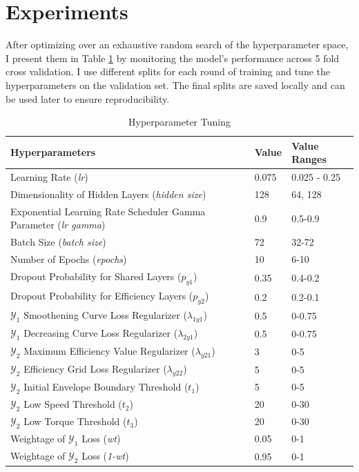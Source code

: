 \documentclass{report} %
\begin{document}
\section{Experiments}\label{sec:Experiments with MLP}

After optimizing over an exhaustive random search of the hyperparameter space, I present them in Table \ref{tab:Hyperparameter Tunings} by monitoring the model's 
performance across 5 fold cross validation. I use different splits for each round of training and tune the hyperparameters on the validation set. 
The final splits are saved locally and can be used later to ensure reproducibility. 

\begin{table}[H]
    \centering
    \begin{tabularx}{\linewidth}{|p{}|p{}|p{}|}
    \hline {\bf Hyperparameters} & {\bf Value} & {\bf Value Ranges}\\
    \hline 
    Learning Rate (\textit{lr}) & 0.075 & 0.025 - 0.25\\
    Dimensionality of Hidden Layers (\textit{hidden size})& 128 & 64, 128\\
    Exponential Learning Rate Scheduler Gamma Parameter (\textit{lr gamma})& 0.9 & 0.5-0.9\\
    Batch Size (\textit{batch size})& 72 & 32-72\\
    Number of Epochs (\textit{epochs})& 10 & 6-10\\
    Dropout Probability for Shared Layers (\textit{$p_{y1}$})& 0.35 & 0.4-0.2\\
    Dropout Probability for Efficiency Layers (\textit{$p_{y2}$}) & 0.2 & 0.2-0.1\\
    $\mathcal{Y}_1$ Smoothening Curve Loss Regularizer (\textit{$\lambda_{1y1}$}) & 0.5 & 0-0.75\\
    $\mathcal{Y}_1$ Decreasing Curve Loss Regularizer (\textit{$\lambda_{2y1}$})& 0.5 & 0-0.75\\
    $\mathcal{Y}_2$ Maximum Efficiency Value Regularizer (\textit{$\lambda_{y21}$})& 3 & 0-5\\
    $\mathcal{Y}_2$ Efficiency Grid Loss Regularizer (\textit{$\lambda_{y22}$}) & 5 & 0-5\\
    $\mathcal{Y}_2$ Initial Envelope Boundary Threshold (\textit{$t_{1}$})& 5 & 0-5\\
    $\mathcal{Y}_2$ Low Speed Threshold (\textit{$t_{2}$})& 20 & 0-30\\
    $\mathcal{Y}_2$ Low Torque Threshold (\textit{$t_{3}$})& 20 & 0-30\\
    Weightage of $\mathcal{Y}_1$ Loss (\textit{wt})& 0.05 & 0-1\\
    Weightage of $\mathcal{Y}_2$ Loss (\textit{1-wt})& 0.95 & 0-1\\
    \hline
    \end{tabularx}
    \caption{Hyperparameter Tuning}
    \label{tab:Hyperparameter Tunings}
\end{table}
\end{document}
